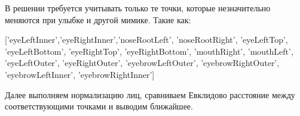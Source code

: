\solutionSection

В решении требуется учитывать только те точки, которые незначительно меняются при улыбке и другой мимике. Такие как: 

['eyeLeftInner','eyeRightInner','noseRootLeft', 'noseRootRight', 'eyeLeftTop', 'eyeLeftBottom', 'eyeRightTop', 'eyeRightBottom', 'mouthRight', 'mouthLeft', 'eyeLeftOuter', 'eyeRightOuter', 'eyebrowLeftOuter', 'eyebrowRightOuter', 'eyebrowLeftInner', 'eyebrowRightInner']

Далее выполняем нормализацию лиц, сравниваем Евклидово расстояние между соответствующими точками и выводим ближайшее.

\codeExample

